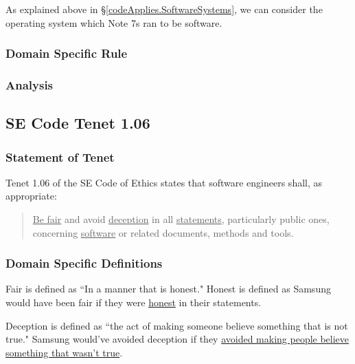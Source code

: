 \documentclass[12pt]{article}
\newcounter{subsubsubsection}[subsubsection]
\begin{document}
      As explained above in \S\ref{codeApplies.SoftwareSystems}, we can consider the operating system which Note 7s ran to be software.
   
   \subsubsection{Domain Specific Rule}
  
   \subsubsection{Analysis}
\fi
      
\subsection{SE Code Tenet 1.06}

   \subsubsection{Statement of Tenet}
      Tenet 1.06 of the SE Code of Ethics states that software engineers shall, as appropriate:
      
      \begin{quote}
		\uline{Be fair} and avoid \uline{deception} in all \uline{statements}, particularly public ones, concerning \uline{software} or related documents, methods and tools.\cite{codeOfEthics}
      \end{quote}
   
   \subsubsection{Domain Specific Definitions}
   
      Fair is defined as ``In a manner that is honest."\cite{merriamDefineFair} Honest is defined as  Samsung would have been fair if they were \uline{honest} in their statements.
      
      Deception is defined as ``the act of making someone believe something that is not true."\cite{merriamDefineDeception} Samsung would've avoided deception if they \uline{avoided making people believe something that wasn't true}. %
      
\end{document}
